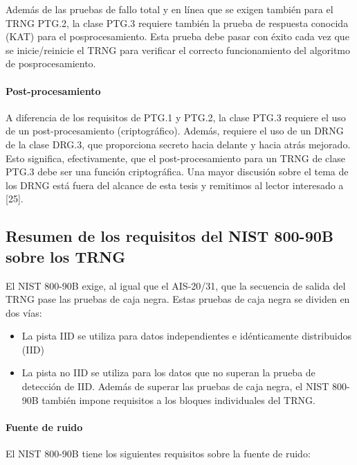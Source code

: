 		Además de las pruebas de fallo total y en línea que se exigen también para el TRNG PTG.2, la clase PTG.3 requiere también la prueba de respuesta conocida (KAT) para el posprocesamiento. Esta prueba debe pasar con éxito cada vez que se inicie/reinicie el TRNG para verificar el correcto funcionamiento del algoritmo de posprocesamiento.
		
	\paragraph{Post-procesamiento\\}
	
	A diferencia de los requisitos de PTG.1 y PTG.2, la clase PTG.3 requiere el uso de un post-procesamiento (criptográfico). Además, requiere el uso de un DRNG de la clase DRG.3, que proporciona secreto hacia delante y hacia atrás mejorado. Esto significa, efectivamente, que el post-procesamiento para un TRNG de clase PTG.3 debe ser una función criptográfica. Una mayor discusión sobre el tema de los DRNG está fuera del alcance de esta tesis y remitimos al lector interesado a [25].
	
		\subsection{Resumen de los requisitos del NIST 800-90B sobre los TRNG}
	
		El NIST 800-90B exige, al igual que el AIS-20/31, que la secuencia de salida del TRNG pase las pruebas de caja negra. Estas pruebas de caja negra se dividen en dos vías:
		
		\begin{itemize}[noitemsep]
			\item La pista IID se utiliza para datos independientes e idénticamente distribuidos (IID)
			\item La pista no IID se utiliza para los datos que no superan la prueba de detección de IID. Además de superar las pruebas de caja negra, el NIST 800-90B también impone requisitos a los bloques individuales del TRNG.
		\end{itemize}
		
		\paragraph{Fuente de ruido\\}
		
			El NIST 800-90B tiene los siguientes requisitos sobre la fuente de ruido:
			
